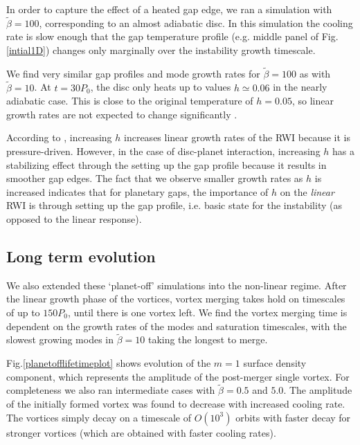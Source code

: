In order to capture the effect of a heated gap edge, we ran a simulation with 
$\tilde{\beta}=100$, corresponding to an almost adiabatic disc.  
In this simulation the cooling rate is slow enough that the gap 
temperature profile (e.g. middle panel of Fig. \ref{intial1D}) changes
only marginally over the instability growth timescale. 

We find very similar gap profiles and mode growth rates for
$\tilde{\beta}=100$ as with $\tilde{\beta}=10$. At $t=30P_0$, the disc only heats up to
values $h\simeq0.06$ in the nearly adiabatic case. This is close to
the original temperature of $h=0.05$, so linear growth rates are not expected
to change significantly \citep{li00}. 

According to \cite{li00}, increasing $h$ increases linear growth rates
of the RWI because it is pressure-driven. However, in the case 
of disc-planet interaction, increasing $h$ has a stabilizing effect
through the setting up the gap profile because it results in smoother gap
edges. The fact that we observe smaller growth rates as $h$ is
increased indicates that for planetary gaps, the importance of $h$ on
the \emph{linear} RWI is through setting up the gap profile, i.e. basic
state for the instability (as opposed to the linear response). 

\subsection{Long term evolution} \label{nonlinearplanetoff} 

We also extended these `planet-off' simulations into the non-linear
regime. After the linear growth phase of the vortices, vortex merging
takes hold on timescales of up to $150P_0$, until there is one vortex
left. We find the vortex merging
time is dependent on the growth rates of the modes and saturation
timescales, with the slowest growing modes in $\tilde\beta=10$ taking
the longest to merge.  

Fig.\ref{planetofflifetimeplot} shows evolution of the $m=1$ surface
density component, which represents the amplitude of the post-merger
single vortex. For completeness we also ran intermediate cases with
$\tilde{\beta}=0.5$ and $5.0$. The amplitude of the initially formed vortex was 
found to decrease with increased cooling rate. The vortices simply decay on a
timescale of $O(10^3)$ orbits with faster decay for stronger vortices
(which are obtained with faster cooling rates). 

